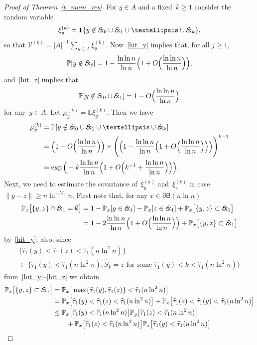\documentclass[11pt]{article}
\theoremstyle{definition}
\numberwithin{equation}{section}
\numberwithin{figure}{section}
\numberwithin{table}{section}
\newcommand{\1}[1]{{\mathbf 1}{\{#1\}}}
\newcommand{\V}{{\mathcal V}}
\newcommand{\Ex}{{\mathcal{E}\!\!\text{\footnotesize{\textsl{x}}}}}
\newcommand{\s}{{\widehat S}}
\newcommand{\8}{{\infty}}
\newcommand{\IP}{{\mathbb P}}
\newcommand{\IE}{{\mathbb E}}
\newcommand{\htau}{\widehat{\tau}}
\newcommand{\B}{{\mathsf B}}
\begin{document}
\begin{proof}[Proof of Theorem~\ref{t_main_res}]
For $y\in A$ and a fixed~$k\geq 1$ consider the random variable
\[
\xi_y^{(k)} = \1{y\notin\Ex_0\cup \Ex_1\cup \ldots \cup \Ex_k},
\]
so that $\V^{(k)} = |A|^{-1}\sum_{y\in A}\xi_y^{(k)}$. Now~\eqref{hit_y} implies that, for all $j\geq 1$,
\[
\IP[y\notin \Ex_j] = 1-\frac{\ln\ln n}{\ln n}
\Big(1+O\Big(\frac{\ln\ln n}{\ln n}\Big)\Big),
\]
and~\eqref{hit_z} implies that
\[
\IP[y\notin \Ex_0\cup\Ex_1] = 1 - O\Big(\frac{\ln\ln n}{\ln n}\Big)
\]
for any~$y\in A$. Let $\mu_y^{(k)}=\IE \xi_y^{(k)}$. Then we have
\begin{align}
\mu_y^{(k)} &= \IP[y\notin\Ex_0\cup \Ex_1\cup \ldots \cup \Ex_k]
\nonumber\\
&= \Big(1-O\Big(\frac{\ln\ln n}{\ln n}\Big)\Big)
\times
\Bigg(\Big(1-\frac{\ln\ln n}{\ln n}
\Big(1+O\Big(\frac{\ln\ln n}{\ln n}\Big)\Big)\Big)
\Bigg)^{k-1}\nonumber\\
&= \exp\Big(-k\frac{\ln\ln n}{\ln n}
\Big(1+O\Big(k^{-1}+\frac{\ln\ln n}{\ln n}\Big)\Big)\Big).\label{est_mu_k}
\end{align}
Next, we need to estimate the covariance of~$\xi_y^{(k)}$ and~$\xi_z^{(k)}$ in case $\|y-z\|\geq n\ln^{-M_0}n$. First note that, for any $x\in \partial\B(n\ln n)$
\begin{align*}
\IP_x\big[\{y,z\}\cap \Ex_1 = \emptyset \big] &= 1-\IP_x[y\in\Ex_1] - \IP_x[z\in\Ex_1] + \IP_x\big[\{y,z\}\subset \Ex_1 \big]\\
&= 1- 2 \frac{\ln\ln n}{\ln n}
\Big(1+O\Big(\frac{\ln\ln n}{\ln n}\Big)\Big) + \IP_x\big[\{y,z\}\subset \Ex_1 \big]
\end{align*}
by~\eqref{hit_y}; also, since
\begin{multline*}
\big\{\htau_1(y)<\htau_1(z)<\htau_1(n\ln^2 n)\big\} \\
\subset
\big\{\htau_1(y)<\htau_1(n\ln^2 n),\s_k=z \text{ for some }
\htau_1(y)<k<\htau_1(n\ln^2 n)\big\}
\end{multline*}
from~\eqref{hit_y}--\eqref{hit_z} we obtain
\begin{align*}
\IP_x\big[\{y,z\}\subset \Ex_1 \big] &=
\IP_x\big[\max\{\htau_1(y),\htau_1(z)\}<\htau_1(n\ln^2 n)\big]
\\
&= \IP_x\big[\htau_1(y)<\htau_1(z)<\htau_1(n\ln^2 n)\big] + \IP_x\big[\htau_1(z)<\htau_1(y)<\htau_1(n\ln^2 n)\big]\\
&\leq \IP_x\big[\htau_1(y)<\htau_1(n\ln^2 n)\big]
\IP_y\big[\htau_1(z)<\htau_1(n\ln^2 n)\big]\\
& \qquad + \IP_x\big[\htau_1(z)<\htau_1(n\ln^2 n)\big]
\IP_z\big[\htau_1(y)<\htau_1(n\ln^2 n)\big]\\

\end{align*}
\end{proof}
\end{document}
